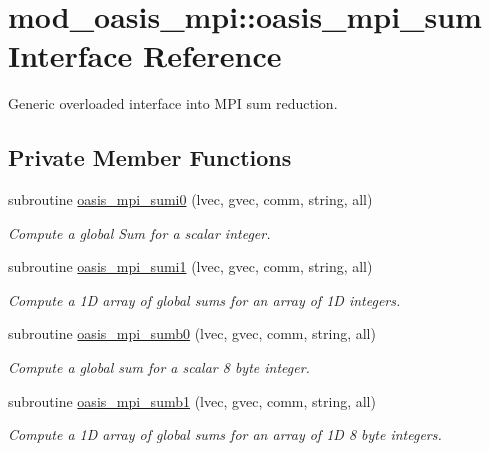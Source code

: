 \hypertarget{interfacemod__oasis__mpi_1_1oasis__mpi__sum}{\section{mod\+\_\+oasis\+\_\+mpi\+:\+:oasis\+\_\+mpi\+\_\+sum Interface Reference}
\label{interfacemod__oasis__mpi_1_1oasis__mpi__sum}
}


Generic overloaded interface into M\+P\+I sum reduction.  


\subsection*{Private Member Functions}
\begin{DoxyCompactItemize}
\item 
subroutine \hyperlink{interfacemod__oasis__mpi_1_1oasis__mpi__sum_ace0332192a77ef918fa53fa5087386cc}{oasis\+\_\+mpi\+\_\+sumi0} (lvec, gvec, comm, string, all)
\begin{DoxyCompactList}\small\item\em Compute a global Sum for a scalar integer. \end{DoxyCompactList}\item 
subroutine \hyperlink{interfacemod__oasis__mpi_1_1oasis__mpi__sum_a98942ad26b72d6ff96fd8631ec70a5ce}{oasis\+\_\+mpi\+\_\+sumi1} (lvec, gvec, comm, string, all)
\begin{DoxyCompactList}\small\item\em Compute a 1\+D array of global sums for an array of 1\+D integers. \end{DoxyCompactList}\item 
subroutine \hyperlink{interfacemod__oasis__mpi_1_1oasis__mpi__sum_a8d3b0d2544f1f360d83076b3d6dfe9e9}{oasis\+\_\+mpi\+\_\+sumb0} (lvec, gvec, comm, string, all)
\begin{DoxyCompactList}\small\item\em Compute a global sum for a scalar 8 byte integer. \end{DoxyCompactList}\item 
subroutine \hyperlink{interfacemod__oasis__mpi_1_1oasis__mpi__sum_af53d904fe38089eb567660f0d4f89fb0}{oasis\+\_\+mpi\+\_\+sumb1} (lvec, gvec, comm, string, all)
\begin{DoxyCompactList}\small\item\em Compute a 1\+D array of global sums for an array of 1\+D 8 byte integers. \end{DoxyCompactList}\item 

\end{DoxyCompactItemize}
